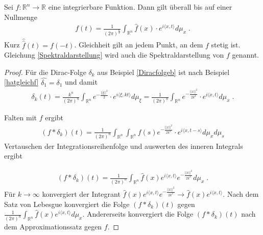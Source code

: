 \begin{Satz}[Umkehrsatz]
Sei $f :\mathbb{R}^n \to \mathbb{R}$ eine integrierbare Funktion. Dann gilt überall bis auf einer Nullmenge
\begin{align}
\label{Spektraldarstellung}
f(t) =  \frac{1}{ (2 \pi)^{\frac{n}{2}}}  \int_{\mathbb{R}^n} \hat{f}(x)  \cdot e^{i \langle x , t  \rangle } d \mu_{x}   \; .
\end{align}
Kurz $\hat{\hat{f}}(t) = f(-t)$. Gleichheit gilt an jedem Punkt, an dem $f$ stetig ist.
Gleichung \ref{Spektraldarstellung} wird auch die Spektraldarstellung von $f$ genannt.
\end{Satz}
\begin{proof}
Für die  Dirac-Folge $\delta_k$ aus Beispiel \ref{Diracfolgeb} ist nach Beispiel \ref{hatgleichf}  $\hat{\delta_1} = \delta_1$  und damit
\begin{align*}
\delta_k(t) =   \frac{k^n}{(2 \pi)^n} \int_{\mathbb{R}^n} e^{- \frac{|| \xi ||^2}{2}}  \cdot e^{i \langle \xi , k t  \rangle }  d \mu_{\xi}  
= \frac{1}{(2 \pi)^n} \int_{\mathbb{R}^n} e^{- \frac{|| x ||^2}{2k^2}}  \cdot e^{i \langle x ,  t  \rangle }  d \mu_{x}  \;.
\end{align*}

Falten mit  $f$ ergibt 
\begin{align*}
(f * \delta_k)(t) = \frac{1}{(2 \pi)^n} \int_{\mathbb{R}^n}\int_{\mathbb{R}^n} f(s) e^{- \frac{|| x ||^2}{2k^2}}  \cdot e^{i \langle x ,  t - s  \rangle }  d \mu_{x}   d \mu_s
\end{align*}
Vertauschen der Integrationsreihenfolge und auswerten des inneren Integrals ergibt 

\begin{align*}
(f * \delta_k)(t) = \frac{1}{(2 \pi)^n} \int_{\mathbb{R}^n}  \hat{f}(x)  e^{i \langle x ,  t  \rangle }  e^{- \frac{|| x ||^2}{2k^2}}  d \mu_{x}  \; .
\end{align*}
Für $k \to \infty$ konvergiert der Integrant $ \hat{f}(x) e^{i \langle x ,  t  \rangle }  e^{- \frac{|| x ||^2}{2k^2}} \to \hat{f}(x) e^{i \langle x ,  t  \rangle } $. Nach dem Satz von Lebesgue konvergiert die Folge $(f *\delta_k)(t)$ gegen $ \frac{1}{(2 \pi)^n} \int_{\mathbb{R}^n}  \hat{f}(x)  e^{i \langle x ,  t  \rangle } d \mu_{x} $. Andererseits konvergiert die Folge $(f *\delta_k)(t)$ nach dem Approximationssatz gegen $f$.
\end{proof}
 
